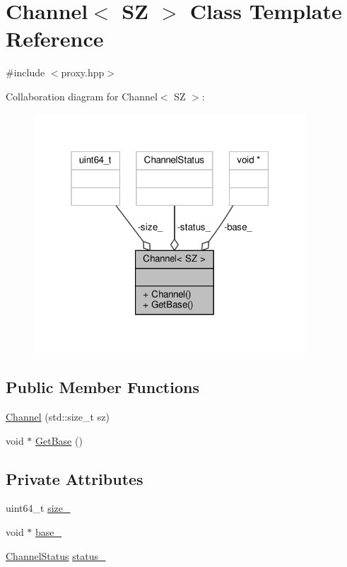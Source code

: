 \hypertarget{classChannel}{}\section{Channel$<$ SZ $>$ Class Template Reference}
\label{classChannel}


{\ttfamily \#include $<$proxy.\+hpp$>$}



Collaboration diagram for Channel$<$ SZ $>$\+:
\nopagebreak
\begin{figure}[H]
\begin{center}
\leavevmode
\includegraphics[width=289pt]{classChannel__coll__graph}
\end{center}
\end{figure}
\subsection*{Public Member Functions}
\begin{DoxyCompactItemize}
\item 
\hyperlink{classChannel_a5e18f101c74be5001d6b34a3026c6f7c}{Channel} (std\+::size\+\_\+t sz)
\item 
void $\ast$ \hyperlink{classChannel_a0bfa9c9c5280c8d3776c2e468f63586b}{Get\+Base} ()
\end{DoxyCompactItemize}
\subsection*{Private Attributes}
\begin{DoxyCompactItemize}
\item 
uint64\+\_\+t \hyperlink{classChannel_a7593f310eba67835f7df73f5afdf44e6}{size\+\_\+}
\item 
void $\ast$ \hyperlink{classChannel_a519cfe913cf0fb5b4c3adfa5df29d40c}{base\+\_\+}
\item 
\hyperlink{proxy_8hpp_abdf990fbe51b4c9d3fdcc2fc3c6f9219}{Channel\+Status} \hyperlink{classChannel_a62d282a44d5b5998c0b4fe8299ee1edd}{status\+\_\+}
\end{DoxyCompactItemize}
